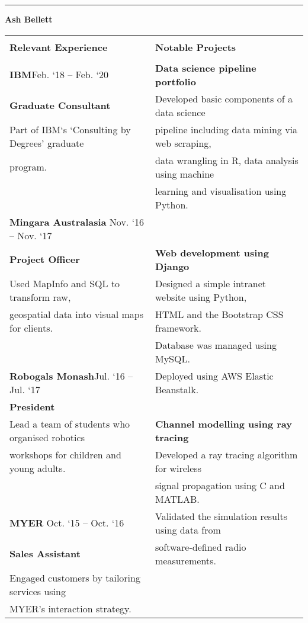 \documentclass{letter}
\begin{document}
	\centering
	\rule{\textwidth}{2mm}
	\LARGE
	\textbf{Ash Bellett}\\
	\large
	\begin{center}
	\begin{tabularx}{\textwidth}{X | X}
	\hline
	 & \\
	\Large \textbf{Relevant Experience} & \Large \textbf{Notable Projects}\\
	 & \\
	\large \textbf{IBM}\hfill Feb. `18 -- Feb. `20 & \textbf{Data science pipeline portfolio} \\
	\textbf{Graduate Consultant} & Developed basic components of a data science \\
	Part of IBM`s `Consulting by Degrees' graduate & pipeline including data mining via web scraping, \\
	program. & data wrangling in R, data analysis using machine\\
	 & learning and visualisation using Python.\\
	\textbf{Mingara Australasia} \hfill Nov. `16 -- Nov. `17 & \\
	\textbf{Project Officer} & \textbf{Web development using Django}\\
	Used MapInfo and SQL to transform raw, & Designed a simple intranet website using Python,\\
	geospatial data into visual maps for clients. & HTML and the Bootstrap CSS framework.\\
	 & Database was managed using MySQL.\\
	\textbf{Robogals Monash}\hfill Jul. `16 -- Jul. `17 & Deployed using AWS Elastic Beanstalk.\\
	\textbf{President} & \\
	Lead a team of students who organised robotics & \textbf{Channel modelling using ray tracing}\\
	workshops for children and young adults. & Developed a ray tracing algorithm for wireless\\
	 & signal propagation using C and MATLAB.\\
	\textbf{MYER} \hfill Oct. `15 -- Oct. `16 & Validated the simulation results using data from\\
	\textbf{Sales Assistant} & software-defined radio measurements.\\
	Engaged customers by tailoring services using & \\
	\cline{2-2}
	MYER's interaction strategy. & \\

\end{tabularx}
\end{center}
\end{document}
